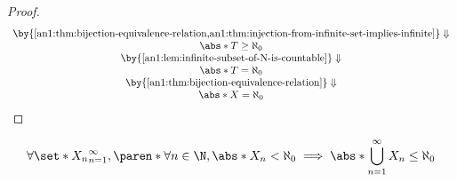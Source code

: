 \begin{proof}
\[\begin{array}{c}
      \by{\Cref{an1:thm:bijection-equivalence-relation,an1:thm:injection-from-infinite-set-implies-infinite}} \Downarrow \\
      \abs*{T} \geq \aleph_{0}                                                                                           \\
      \by{\Cref{an1:lem:infinite-subset-of-N-is-countable}} \Downarrow                                                   \\
      \abs*{T} = \aleph_{0}                                                                                              \\
      \by{\Cref{an1:thm:bijection-equivalence-relation}} \Downarrow                                                      \\
      \abs*{X} = \aleph_{0}
    \end{array}
  \]
\end{proof}

\begin{theorem} \label{an1:thm:countable-union-of-finite-sets-is-at-most-countable}
  \[
    \forall \set*{X_{n}}_{n = 1}^{\infty},
    \paren*{\forall n \in \N, \abs*{X_{n}} < \aleph_{0}}
    \implies \abs*{\bigcup_{n = 1}^{\infty} X_{n}} \leq \aleph_{0}
  \]
\end{theorem}

